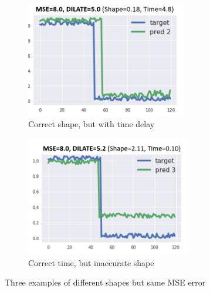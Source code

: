 \begin{figure}[h!]
  \begin{subfigure}[b]{0.3\textwidth}
    \centering
    \caption{Correct shape, but with time delay}
    \label{fig:dilate-correct-shape}
    \includegraphics[width=\textwidth]{./figs/illustrations/dilate_ex2.png}
    \hfill
  \end{subfigure}
  \begin{subfigure}[b]{0.3\textwidth}
    \centering
    \caption{Correct time, but inaccurate shape}
    \label{fig:dilate-correct-time}
    \includegraphics[width=\textwidth]{./figs/illustrations/dilate_ex3.png}
    \hfill
  \end{subfigure}
  \caption{Three examples of different shapes but same MSE error \citep{Guen2019}}
  \label{fig:dilate}
\end{figure}

